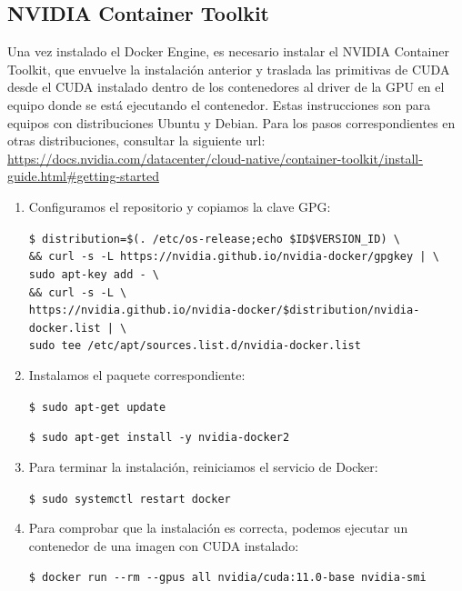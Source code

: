 \subsection{NVIDIA Container Toolkit}
Una vez instalado el Docker Engine, es necesario instalar el NVIDIA Container Toolkit, que envuelve la instalación anterior y traslada las primitivas de CUDA desde el CUDA instalado dentro de los contenedores al driver de la GPU en el equipo donde se está ejecutando el contenedor. Estas instrucciones son para equipos con distribuciones Ubuntu y Debian. Para los pasos correspondientes en otras distribuciones, consultar la siguiente url: \url{https://docs.nvidia.com/datacenter/cloud-native/container-toolkit/install-guide.html#getting-started}

\begin{enumerate}
\item Configuramos el repositorio y copiamos la clave GPG:

\texttt{\$ distribution=\$(. /etc/os-release;echo \$ID\$VERSION{\_}ID) \textbackslash \\ \&\& curl -s -L https://nvidia.github.io/nvidia-docker/gpgkey | \textbackslash \\ sudo apt-key add - \textbackslash \\ \&\& curl -s -L \textbackslash \\ https://nvidia.github.io/nvidia-docker/\$distribution/nvidia-docker.list | \textbackslash \\ sudo tee /etc/apt/sources.list.d/nvidia-docker.list}

\item Instalamos el paquete correspondiente:

\texttt{\$ sudo apt-get update}

\texttt{\$ sudo apt-get install -y nvidia-docker2}

\item Para terminar la instalación, reiniciamos el servicio de Docker:

\texttt{\$ sudo systemctl restart docker}

\item Para comprobar que la instalación es correcta, podemos ejecutar un contenedor de una imagen con CUDA instalado:

\texttt{\$ docker run {-}{-}rm {-}{-}gpus all nvidia/cuda:11.0-base nvidia-smi}

\end{enumerate}

